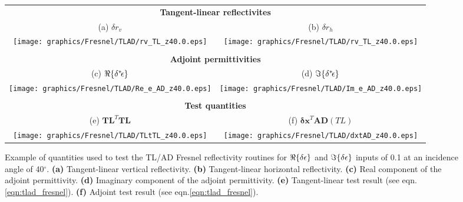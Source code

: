 \begin{figure}[htp]
  \centering
  \begin{tabular}{c c}
    \multicolumn{2}{c}{\sffamily\textbf{Tangent-linear reflectivites}}\\
    \textsf{(a)} $\delta r_v$ &
    \textsf{(b)} $\delta r_h$ \\
    \texttt{[image: graphics/Fresnel/TLAD/rv\_TL\_z40.0.eps]} &
    \texttt{[image: graphics/Fresnel/TLAD/rv\_TL\_z40.0.eps]} \\\\
    \multicolumn{2}{c}{\sffamily\textbf{Adjoint permittivities}}\\
    \textsf{(c)} $\Re\{\delta^{*}\! \epsilon\}$ &
    \textsf{(d)} $\Im\{\delta^{*}\! \epsilon\}$ \\
    \texttt{[image: graphics/Fresnel/TLAD/Re\_e\_AD\_z40.0.eps]} &
    \texttt{[image: graphics/Fresnel/TLAD/Im\_e\_AD\_z40.0.eps]} \\\\
    \multicolumn{2}{c}{\sffamily\textbf{Test quantities}}\\
    \textsf{(e)} $\mathbf{TL}^{T}\mathbf{TL}$ &
    \textsf{(f)} $\mathbf{\delta x}^{T}\mathbf{AD}(TL)$ \\
    \texttt{[image: graphics/Fresnel/TLAD/TLtTL\_z40.0.eps]} & 
    \texttt{[image: graphics/Fresnel/TLAD/dxtAD\_z40.0.eps]}
  \end{tabular}
  \caption{Example of quantities used to test the TL/AD Fresnel reflectivity routines for $\Re\{\delta\epsilon\}$ and $\Im\{\delta\epsilon\}$ inputs of 0.1 at an incidence angle of 40$^{\circ}$. \textbf{(a)} Tangent-linear vertical reflectivity. \textbf{(b)} Tangent-linear horizontal reflectivity. \textbf{(c)} Real component of the adjoint permittivity.  \textbf{(d)} Imaginary component of the adjoint permittivity. \textbf{(e)} Tangent-linear test result (see eqn.\ref{eqn:tlad_fresnel}). \textbf{(f)} Adjoint test result (see eqn.\ref{eqn:tlad_fresnel}).}
  \label{fig:tlad_z40.0_fresnel}
\end{figure}

